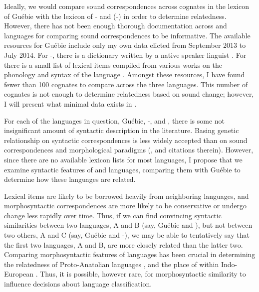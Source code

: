 \documentclass[output=paper,modfonts]{langscibook}
\begin{document}
Ideally, we would compare sound correspondences across cognates in the lexicon of Guébie with the lexicon of - and  (-) in order to determine relatedness. However, there has not been enough thorough documentation across  and  languages for comparing sound correspondences to be informative. The available resources for Guébie include only my own data elicted from September 2013 to July 2014. %
For -, there is a dictionary written by a native speaker linguist \citep{Zogbo2005}. For  there is a small list of lexical items compiled from various works on the phonology and syntax of the language \citep{Marchese1979, Kaye1981, Koopman1984}. Amongst these resources, I have found fewer than 100 cognates to compare across the three languages. This number of cognates is not enough to determine relatedness based on sound change; however, I will present what minimal data exists in .

For each of the languages in question, Guébie, -, and , there is some not insignificant amount of syntactic description in the literature. Basing genetic relationship on syntactic correspondences is less widely accepted than on sound correspondences and morphological paradigms (\citealt{Garrett2012, RingeEska2014}, and citations therein). However, since there are no available lexicon lists for most  languages, I propose that we examine syntactic features of  and  languages, comparing them with Guébie to determine how these languages are related.

Lexical items are likely to be borrowed heavily from neighboring languages, and morphosyntactic correspondences are more likely to be conservative or undergo change less rapidly over time. Thus, if we can find convincing syntactic similarities between two languages, A and B (say, Guébie and ), but not between two others, A and C (say, Guébie and -), we may be able to tentatively say that the first two languages, A and B, are more closely related than the latter two. Comparing morphosyntactic features of languages has been crucial in determining the relatedness of Proto-Anatolian languages \citep{Melchert2013}, and the place of  within Indo-European \citep{Hübschmann1875}. Thus, it is possible, however rare, for morphosyntactic similarity to influence decisions about language classification.
\end{document}
